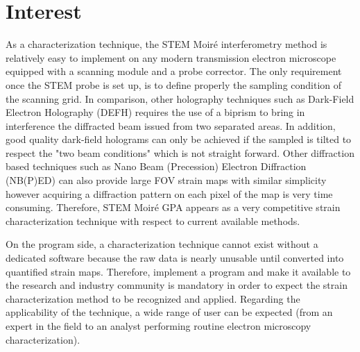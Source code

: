 \documentclass{article}
\begin{document}
\section{Interest}
As a characterization technique, the STEM Moir{\'e} interferometry method is relatively easy to implement on any modern transmission electron microscope equipped with a scanning module and a probe corrector. The only requirement once the STEM probe is set up, is to define properly the sampling condition of the scanning grid. In comparison, other holography techniques such as Dark-Field Electron Holography (DEFH) \cite{Hytch2008} requires the use of a biprism to bring in interference the diffracted beam issued from two separated areas. In addition, good quality dark-field holograms can only be achieved if the sampled is tilted to respect the "two beam conditions" which is not straight forward. Other diffraction based techniques such as Nano Beam (Precession) Electron Diffraction (NB(P)ED) \cite{Rouviere2013} can also provide large FOV strain maps with similar simplicity however acquiring a diffraction pattern on each pixel of the map is very time consuming. Therefore, STEM Moir{\'e} GPA appears as a very competitive strain characterization technique with respect to current available methods.\par \medskip
On the program side, a characterization technique cannot exist without a dedicated software because the raw data is nearly unusable until converted into quantified strain maps. Therefore, implement a program and make it available to the research and industry community is mandatory in order to expect the strain characterization method to be recognized and applied. Regarding the applicability of the technique, a wide range of user can be expected (from an expert in the field to an analyst performing routine electron microscopy characterization). 



\end{document}
